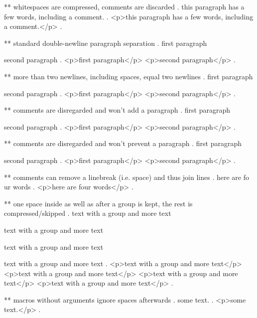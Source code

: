 ** whitespaces are compressed, comments are discarded
.
   this     paragraph  has a    few 
 words,   including
a comment.
.
<p>this paragraph has a few words, including a comment.</p>
.


** standard double-newline paragraph separation
.
first paragraph

second paragraph
.
<p>first paragraph</p>
<p>second paragraph</p>
.



** more than two newlines, including spaces, equal two newlines
.
first paragraph

   
  


second paragraph
.
<p>first paragraph</p>
<p>second paragraph</p>
.


** comments are disregarded and won't add a paragraph
.
first paragraph




second paragraph
.
<p>first paragraph</p>
<p>second paragraph</p>
.

** comments are disregarded and won't prevent a paragraph
.
first paragraph %

second paragraph
.
<p>first paragraph</p>
<p>second paragraph</p>
.


** comments can remove a linebreak (i.e. space) and thus join lines
.
here are fo%
ur words
.
<p>here are four words</p>
.


** one space inside as well as after a group is kept, the rest is compressed/skipped
.
text with {a group} and more text

text with { a group } and more text

text with { a group  } and more text

text with {  a group  }  and more text
.
<p>text with a group and more text</p>
<p>text with  a group  and more text</p>
<p>text with  a group  and more text</p>
<p>text with  a group  and more text</p>
.

** macros without arguments ignore spaces afterwards
.
some \echo  text.
.
<p>some text.</p>
.

